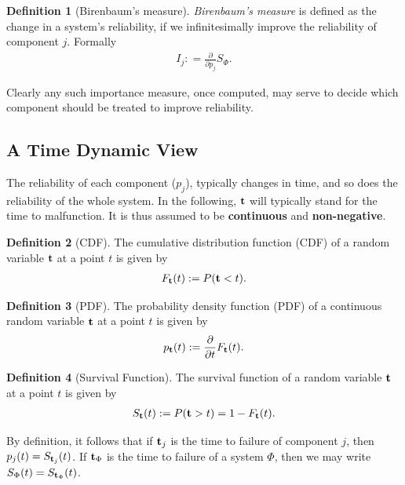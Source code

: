 \documentclass[12pt,a4paper]{report}
\theoremstyle{plain}
\theoremstyle{definition}
\newtheorem{definition}{Definition}
\newcommand{\struct}{\Phi}
\begin{document}
\begin{definition}[Birenbaum's measure]
\emph{Birenbaum's measure} is defined as the change in a system's reliability, if we infinitesimally improve the reliability of component $j$.
Formally 
\begin{align}
	I_j: =\frac{\partial}{\partial p_j} S_{\Phi}.
\end{align}
\end{definition}


Clearly any such importance measure, once computed, may serve to decide which component should be treated to improve reliability.







\subsection{A Time Dynamic View}
The reliability of each component ($p_j$), typically changes in time, and so does the reliability of the whole system.
In the following, $\mathbf{t}$ will typically stand for the time to malfunction. It is thus assumed to be \textbf{continuous} and \textbf{non-negative}.


\begin{definition}[CDF]
The cumulative distribution function (CDF) of a random variable $\mathbf{t}$ at a point $t$  is given by
\begin{align}
	F_{\mathbf{t}} (t):= P(\mathbf{t}<t).
\end{align}
\end{definition}

\begin{definition}[PDF]
The probability density function (PDF) of a continuous random variable $\mathbf{t}$ at a point $t$ is given by 
\begin{align}
	p_{\mathbf{t}} (t):= \frac{\partial}{\partial t}F_{\mathbf{t}} (t).
\end{align}
\end{definition}


\begin{definition}[Survival Function]
The survival function of a random variable $\mathbf{t}$ at a point $t$ is given by 
\begin{align}
	S_{\mathbf{t}} (t):= P(\mathbf{t}>t)=1-F_{\mathbf{t}} (t).
\end{align}
\end{definition}
By definition, it follows that if $\mathbf{t}_j$ is the time to failure of component $j$, then $p_j(t)=S_{\mathbf{t}_j} (t)$.
If $\T_\struct$ is the time to failure of a system $\Phi$, then we may write $S_\struct(t)=\survive{\T_\struct}{t}$.
\end{document}
